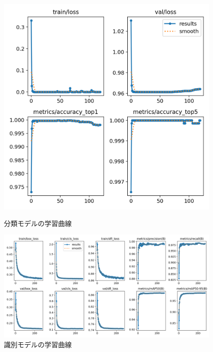 \begin{figure}[htbp]
	\begin{minipage}[b]{0.28\linewidth}
		\centering
		\includegraphics[width=\linewidth]{fig/results_cls.png}
		\caption{分類モデルの学習曲線}
	\end{minipage}
	\begin{minipage}[b]{0.6\linewidth}
		\centering
		\includegraphics[width=\linewidth]{fig/results_det.png}
		\caption{識別モデルの学習曲線}
	\end{minipage}
\end{figure}


